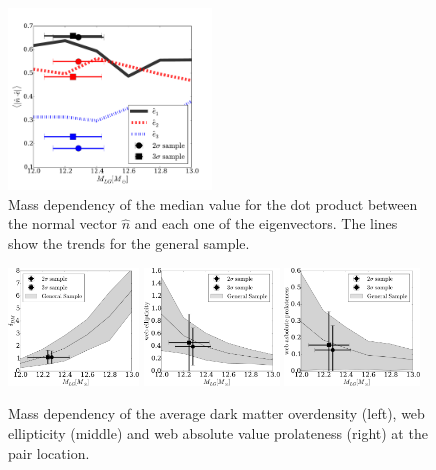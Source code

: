 \documentclass{emulateapj}
\begin{document}
\begin{figure}
\begin{center}
  \includegraphics[width=0.48\textwidth]{median_mass_alignment.pdf}
\caption{Mass dependency of the median value for the dot product
  between the normal vector $\hat{n}$ and each one of the
  eigenvectors.  The lines show the trends for the general sample.
\label{fig:median_alignment_n}}
\end{center}
\end{figure}


\begin{figure}
\begin{center}
  \includegraphics[width=0.31\textwidth]{median_mass_overdensity.pdf} 
  \includegraphics[width=0.32\textwidth]{median_mass_ellipticity.pdf} 
  \includegraphics[width=0.32\textwidth]{median_mass_prolateness.pdf} 
\caption{Mass dependency of the average dark matter overdensity (left),
  web ellipticity (middle) and web absolute value prolateness (right) at the
  pair location.
\label{fig:median_overdensity}}
\end{center}
\end{figure}
\end{document}
